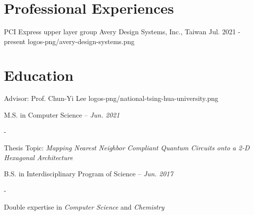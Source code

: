\documentclass{cvclass}
\begin{document}
\makeinfo


\section{Professional Experiences}

    {PCI Express upper layer group}
    {Avery Design Systems, Inc., Taiwan}
    {Jul. 2021 - present}
    {logos-png/avery-design-systems.png}


\section{Education}

        {Advisor: Prof. Chun-Yi Lee}
        {logos-png/national-tsing-hua-university.png}{
    \item M.S. in Computer Science -- \textit{Jun. 2021}
    \begin{plainitemize}{-}
        \item Thesis Topic: \textit{Mapping Nearest Neighbor Compliant Quantum Circuits onto a 2-D Hexagonal Architecture}
    \end{plainitemize}
    \item B.S. in Interdisciplinary Program of Science -- \textit{Jun. 2017}
    \begin{plainitemize}{-}
        \item Double expertise in \textit{Computer Science} and \textit{Chemistry}
    \end{plainitemize}}


\end{document}
